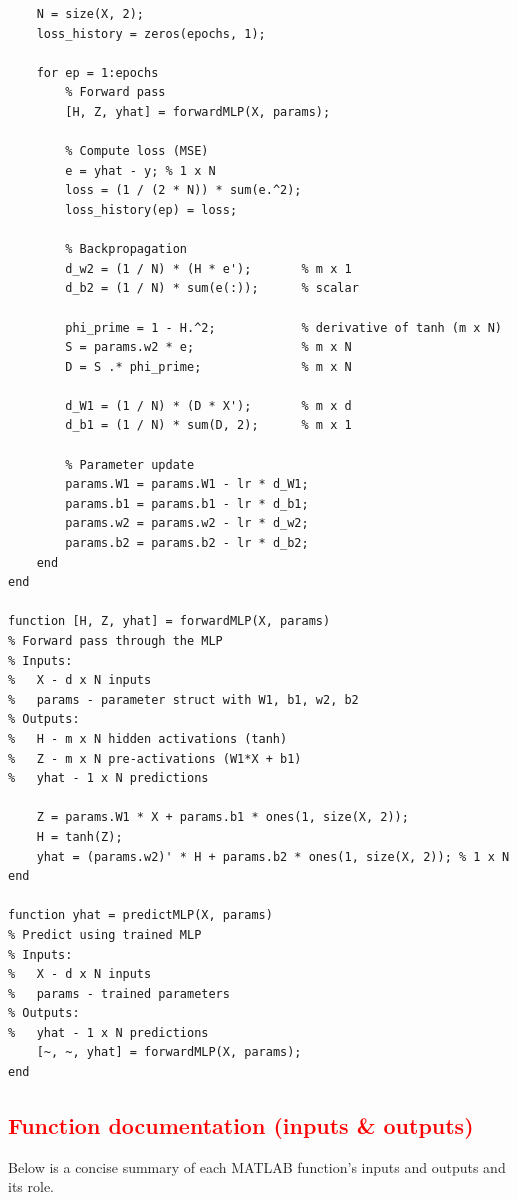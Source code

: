 \documentclass[11pt,a4paper]{article}
\begin{document}
\begin{verbatim}
    N = size(X, 2);
    loss_history = zeros(epochs, 1);

    for ep = 1:epochs
        % Forward pass
        [H, Z, yhat] = forwardMLP(X, params);

        % Compute loss (MSE)
        e = yhat - y; % 1 x N
        loss = (1 / (2 * N)) * sum(e.^2);
        loss_history(ep) = loss;

        % Backpropagation
        d_w2 = (1 / N) * (H * e');       % m x 1
        d_b2 = (1 / N) * sum(e(:));      % scalar

        phi_prime = 1 - H.^2;            % derivative of tanh (m x N)
        S = params.w2 * e;               % m x N
        D = S .* phi_prime;              % m x N

        d_W1 = (1 / N) * (D * X');       % m x d
        d_b1 = (1 / N) * sum(D, 2);      % m x 1

        % Parameter update
        params.W1 = params.W1 - lr * d_W1;
        params.b1 = params.b1 - lr * d_b1;
        params.w2 = params.w2 - lr * d_w2;
        params.b2 = params.b2 - lr * d_b2;
    end
end

function [H, Z, yhat] = forwardMLP(X, params)
% Forward pass through the MLP
% Inputs:
%   X - d x N inputs
%   params - parameter struct with W1, b1, w2, b2
% Outputs:
%   H - m x N hidden activations (tanh)
%   Z - m x N pre-activations (W1*X + b1)
%   yhat - 1 x N predictions

    Z = params.W1 * X + params.b1 * ones(1, size(X, 2));
    H = tanh(Z);
    yhat = (params.w2)' * H + params.b2 * ones(1, size(X, 2)); % 1 x N
end

function yhat = predictMLP(X, params)
% Predict using trained MLP
% Inputs:
%   X - d x N inputs
%   params - trained parameters
% Outputs:
%   yhat - 1 x N predictions
    [~, ~, yhat] = forwardMLP(X, params);
end
\end{verbatim}

\subsection{\textcolor{red}{Function documentation (inputs \& outputs)}}
Below is a concise summary of each MATLAB function's inputs and outputs and its role.
\end{document}
